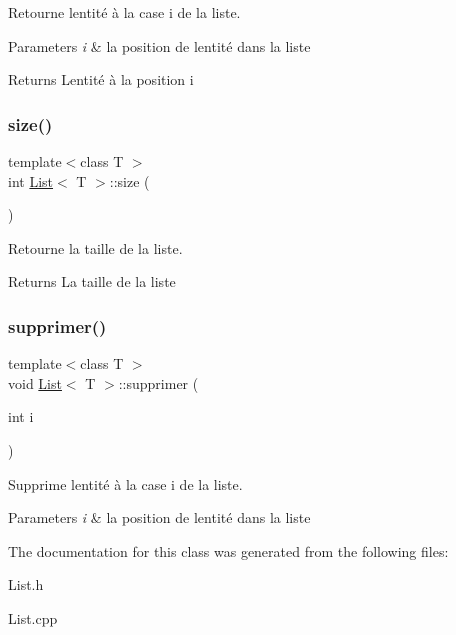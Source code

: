 Retourne l\textquotesingle{}entité à la case i de la liste. 


\begin{DoxyParams}{Parameters}
{\em i} & la position de l\textquotesingle{}entité dans la liste \\
\hline
\end{DoxyParams}
\begin{DoxyReturn}{Returns}
L\textquotesingle{}entité à la position i 
\end{DoxyReturn}
\mbox{\label{classList_a2497bdf42246d61237aaf046c116183a}} 
\subsubsection{\texorpdfstring{size()}{size()}}
{\footnotesize\ttfamily template$<$class T $>$ \\
int \hyperlink{classList}{List}$<$ T $>$\+::size (\begin{DoxyParamCaption}{ }\end{DoxyParamCaption})}



Retourne la taille de la liste. 

\begin{DoxyReturn}{Returns}
La taille de la liste 
\end{DoxyReturn}
\mbox{\label{classList_a899168b34e19805a4bcf6378583aa501}} 
\subsubsection{\texorpdfstring{supprimer()}{supprimer()}}
{\footnotesize\ttfamily template$<$class T $>$ \\
void \hyperlink{classList}{List}$<$ T $>$\+::supprimer (\begin{DoxyParamCaption}\item[{int}]{i }\end{DoxyParamCaption})}



Supprime l\textquotesingle{}entité à la case i de la liste. 


\begin{DoxyParams}{Parameters}
{\em i} & la position de l\textquotesingle{}entité dans la liste \\
\hline
\end{DoxyParams}


The documentation for this class was generated from the following files\+:\begin{DoxyCompactItemize}
\item 
List.\+h\item 
List.\+cpp\end{DoxyCompactItemize}
